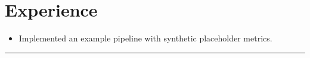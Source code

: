 \documentclass[11pt,a4paper]{article}
\begin{document}
\section*{Experience}
\begin{itemize}[leftmargin=*]
\item Implemented an example pipeline with synthetic placeholder metrics.
\end{itemize}
\noindent\rule{\dimexpr\linewidth+0.78pt\relax}{0.4pt}
\end{document}
